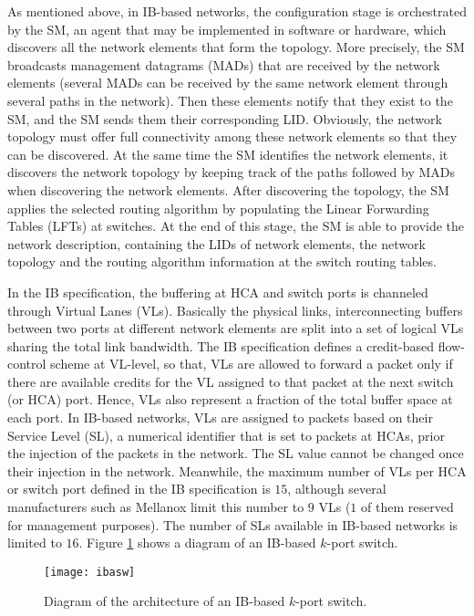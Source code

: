 \documentclass[review]{elsarticle}
\newcommand{\ib}{IB}
\begin{document}
As mentioned above, in \ib-based networks, the configuration stage is orchestrated by the SM, an agent that may be implemented in software or hardware, which discovers all the network elements that form the topology.
More precisely, the SM broadcasts management datagrams (MADs) that are received by the network elements (several MADs can be received by the same network element through several paths in the network).
Then these elements notify that they exist to the SM, and the SM sends them their corresponding LID. 
Obviously, the network topology must offer full connectivity among these network elements so that they can be discovered.
At the same time the SM identifies the network elements, it discovers the network topology by keeping track of the paths followed by MADs when discovering the network elements.
After discovering the topology, the SM applies the selected routing algorithm by populating the Linear Forwarding Tables (LFTs) at switches.
At the end of this stage, the SM is able to provide the network description, containing the LIDs of network elements, the network topology and the routing algorithm information at the switch routing tables.

In the \ib{} specification, the buffering at HCA and switch ports is channeled through Virtual Lanes (VLs).
Basically the physical links, interconnecting buffers between two ports at different network elements are split into a set of logical VLs sharing the total link bandwidth.
The \ib{} specification defines a credit-based flow-control scheme at VL-level, so that,
VLs are allowed to forward a packet only if there are available credits for the VL assigned to that packet at the next switch (or HCA) port.
Hence, VLs also represent a fraction of the total buffer space at each port.%
In \ib-based networks, VLs are assigned to packets based on their Service Level (SL), a numerical identifier that is set to packets at HCAs, prior the injection of the packets in the network.
The SL value cannot be changed once their injection in the network.
Meanwhile, the maximum number of VLs per HCA or switch port defined in the \ib{} specification is $15$, although several manufacturers such as Mellanox limit this number to $9$ VLs
($1$ of them reserved for management purposes).
The number of SLs available in \ib-based networks is limited to $16$.
Figure \ref{f:ibaswschem} shows a diagram of an \ib-based $k$-port switch.

\begin{figure}[!htb]
	\centering
	\texttt{[image: ibasw]}
	\caption{Diagram of the architecture of an \ib-based $k$-port switch.}
	\label{f:ibaswschem}
\end{figure}
\end{document}
